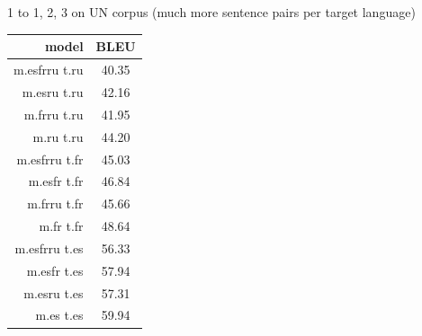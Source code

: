 \section{}
1 to 1, 2, 3 on UN corpus (much more sentence pairs per target language)

\begin{table}[h!]
\centering
\begin{tabular}{r|c}
\toprule
model         & BLEU  \\
\midrule
m.esfrru t.ru & 40.35 \\
m.esru t.ru   & 42.16 \\
m.frru t.ru   & 41.95 \\
m.ru t.ru     & 44.20 \\
m.esfrru t.fr & 45.03 \\
m.esfr t.fr   & 46.84 \\
m.frru t.fr   & 45.66 \\
m.fr t.fr     & 48.64 \\
m.esfrru t.es & 56.33 \\
m.esfr t.es   & 57.94 \\
m.esru t.es   & 57.31 \\
m.es t.es     & 59.94 \\
\bottomrule
\end{tabular}
\end{table}
